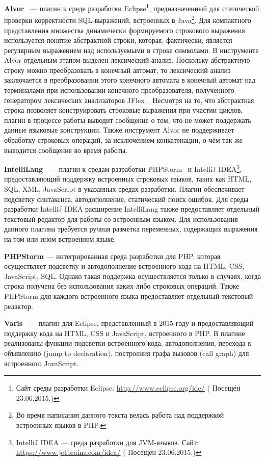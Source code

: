 \textbf{Alvor}~\cite{Alvor1, Alvor2, AlvorUrl} {---} плагин к среде разработки Eclipse\footnote{Сайт среды разработки Eclipse: \url{http://www.eclipse.org/ide/} ( Посещён 23.06.2015.)}, предназначенный для статической проверки корректности SQL-выражений, встроенных в Java\footnote{Во время написания данного текста велась работа над поддержкой встроенных языков в PHP.}. Для компактного представления множества динамически формируемого строкового выражения используется понятие абстрактной строки, которая, фактически, является регулярным выражением над используемыми в строке символами. В инструменте Alvor отдельным этапом выделен лексический анализ. Поскольку абстрактную строку можно преобразовать в конечный автомат, то лексический анализ заключается в преобразовании этого конечного автомата в конечный автомат над терминалами при  использовании конечного преобразователя, полученного генератором лексических анализаторов JFlex~\cite{JFlex}. Несмотря на то, что абстрактная строка позволяет конструировать строковые выражения при участии циклов, плагин в процессе работы выводит сообщение  о том, что не может поддержать данные языковые конструкции. Также инструмент Alvor не поддерживает обработку строковых операций, за исключением конкатенации, о чём так же выводится сообщение во время работы.

\textbf{IntelliLang~\cite{IntelliLang}} --- плагин к средам разработки PHPStorm~\cite{PHPStorm} и IntelliJ IDEA\footnote{IntelliJ IDEA --- среда разработки для JVM-языков. Сайт: \url{https://www.jetbrains.com/idea/} ( Посещён 23.06.2015.)}, предоставляющий поддержку встроенных строковых языков, таких как HTML, SQL, XML, JavaScript в указанных средах разработки. Плагин обеспечивает подсветку синтаксиса, автодополнение, статический поиск ошибок. Для среды разработки IntelliJ IDEA расширение IntelliLang также предоставляет отдельный текстовый редактор для работы со встроенным языком. Для использования данного плагина требуется ручная разметка переменных, содержащих выражения на том или ином встроенном языке.
    
\textbf{PHPStorm \cite{PHPStorm}} --- интегрированная среда разработки для PHP, которая осуществляет подсветку и автодополнение встроенного кода на HTML, CSS, JavaScript, SQL. Однако такая поддержка осуществляется только в случаях, когда строка получена без использования каких-либо строковых операций. Также PHPStorm для каждого встроенного языка предоставляет отдельный текстовый редактор. 

\textbf{Varis~\cite{Varis}} ---  плагин для Eclipse, представленный в 2015 году и предоставляющий поддержку кода на HTML, CSS и JavaScript, встроенного в PHP. В плагине реализованы функции  подсветки встроенного кода, автодополнения, перехода к объявлению (jump to declaration), построения графа вызовов (call graph) для встроенного JavaScript.

